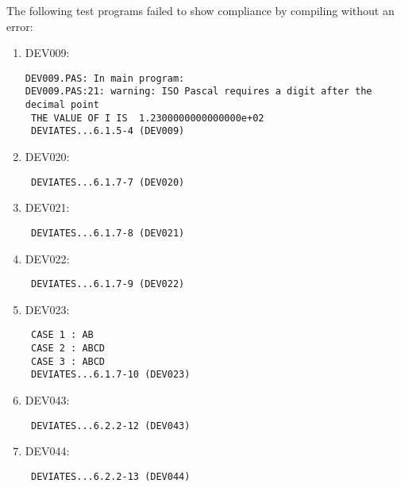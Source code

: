 \documentclass[a4paper]{article}
\begin{document}
The following test programs failed to show compliance by compiling without an error:
\begin{enumerate}
    
    \item DEV009: 
        \begin{small}\begin{verbatim}
DEV009.PAS: In main program:
DEV009.PAS:21: warning: ISO Pascal requires a digit after the decimal point
 THE VALUE OF I IS  1.2300000000000000e+02
 DEVIATES...6.1.5-4 (DEV009)
        \end{verbatim}\end{small}

    \item DEV020: 
        \begin{small}\begin{verbatim}
 DEVIATES...6.1.7-7 (DEV020)
        \end{verbatim}\end{small}

    \item DEV021: 
        \begin{small}\begin{verbatim}
 DEVIATES...6.1.7-8 (DEV021)
        \end{verbatim}\end{small}

    \item DEV022: 
        \begin{small}\begin{verbatim}
 DEVIATES...6.1.7-9 (DEV022)
        \end{verbatim}\end{small}

    \item DEV023: 
        \begin{small}\begin{verbatim}
 CASE 1 : AB  
 CASE 2 : ABCD  
 CASE 3 : ABCD
 DEVIATES...6.1.7-10 (DEV023)
        \end{verbatim}\end{small}

    \item DEV043: 
        \begin{small}\begin{verbatim}
 DEVIATES...6.2.2-12 (DEV043)
        \end{verbatim}\end{small}

    \item DEV044: 
        \begin{small}\begin{verbatim}
 DEVIATES...6.2.2-13 (DEV044)
        \end{verbatim}\end{small}


\end{enumerate}
\end{document}
